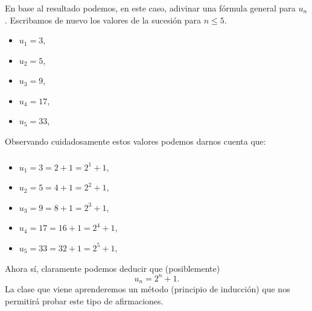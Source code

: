 \documentclass[handout]{beamer} %
\begin{document}
\begin{frame}\frametitle{} 
 En base al resultado podemos,  en este caso, adivinar una fórmula general para $u_n$. Escribamos de nuevo los valores de la sucesión para $n \le 5$. 
 
 \medspace \pause 
 
 \begin{itemize}
  	\item $ u_1=3$, \pause 
 	\item $u_2=5$,\pause 
 	\item $u_{3} = 9$,\pause 
 	\item $u_{4} = 17$,\pause 
 	\item $u_{5} = 33$,
\end{itemize}

\medspace 
\pause 
\pause Observando cuidadosamente estos valores podemos darnos cuenta que:
	
\end{frame}

\begin{frame}\frametitle{} 

	\begin{itemize}
		\item $ u_1=3 = 2 +1 = 2^1 + 1$, \pause 
		\item $u_2=5 = 4 +1 = 2^2 + 1$,\pause 
		\item $u_{3} = 9 = 8 +1 = 2^3 + 1$,\pause 
		\item $u_{4} = 17 = 16 +1 = 2^4 + 1$,\pause 
		\item $u_{5} = 33 = 32 +1 = 2^5 + 1$,\pause 
	\end{itemize}
\medspace 

Ahora sí,  claramente podemos deducir que (posiblemente) 
$$u_{n} =  2^n + 1.$$ \pause 
La clase que viene aprenderemos un método (principio de inducción) que nos permitirá probar este tipo de afirmaciones. 
	
\end{frame}



\end{document}
